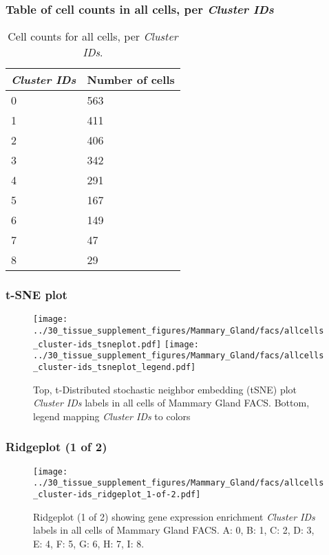 \subsubsection{Table of cell counts in all cells, per \emph{Cluster IDs}}\begin{table}[h]
\centering
\label{my-label}
\begin{tabular}{@{}ll@{}}
\toprule

\emph{Cluster IDs}& Number of cells \\ \midrule
0 & 563 \\

1 & 411 \\

2 & 406 \\

3 & 342 \\

4 & 291 \\

5 & 167 \\

6 & 149 \\

7 & 47 \\

8 & 29 \\
\bottomrule
\end{tabular}
\caption{Cell counts for all cells, per \emph{Cluster IDs}.}
\end{table}

\clearpage
\subsubsection{t-SNE plot}
\begin{figure}[h]
\centering
\texttt{[image: ../30\_tissue\_supplement\_figures/Mammary\_Gland/facs/allcells\_cluster-ids\_tsneplot.pdf]}
\texttt{[image: ../30\_tissue\_supplement\_figures/Mammary\_Gland/facs/allcells\_cluster-ids\_tsneplot\_legend.pdf]}
\caption{Top, t-Distributed stochastic neighbor embedding (tSNE) plot  \emph{Cluster IDs} labels in all cells of Mammary Gland FACS. Bottom, legend mapping \emph{Cluster IDs} to colors}
\end{figure}


\clearpage

\subsubsection{Ridgeplot (1 of 2)}
\begin{figure}[h]
\centering
\texttt{[image: ../30\_tissue\_supplement\_figures/Mammary\_Gland/facs/allcells\_cluster-ids\_ridgeplot\_1-of-2.pdf]}

\caption{ Ridgeplot (1 of 2)  showing gene expression enrichment \emph{Cluster IDs} labels in all cells of Mammary Gland FACS. A: 0, B: 1, C: 2, D: 3, E: 4, F: 5, G: 6, H: 7, I: 8.}
\end{figure}


